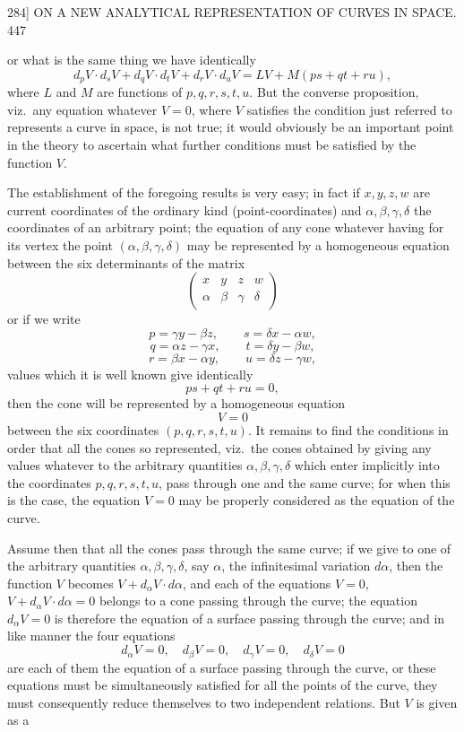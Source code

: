 \documentclass[11pt]{article}
\begin{document}
\begin{center}
\textsc{284]} \hfill ON A NEW ANALYTICAL REPRESENTATION OF CURVES IN SPACE. \hfill 447
\end{center}

or what is the same thing we have identically
\[ d_{p}V\cdot d_{s}V+d_{q}V\cdot d_{t}V+d_{r}V\cdot d_{u}V=LV+M(ps+qt+ru), \]
where $L$ and $M$ are functions of $p,q,r,s,t,u$. But the converse proposition, viz.\
any equation whatever $V=0$, where $V$ satisfies the condition just referred to
represents a curve in space, is not true; it would obviously be an important point
in the theory to ascertain what further conditions must be satisfied by the function
$V$.

The establishment of the foregoing results is very easy; in fact if $x,y,z,w$ are
current coordinates of the ordinary kind (point-coordinates) and $\alpha,\beta,\gamma,\delta$
the coordinates of an arbitrary point; the equation of any cone whatever having for
its vertex the point $(\alpha,\beta,\gamma,\delta)$ may be represented by a
homogeneous equation between the six determinants of the matrix
\[ \begin{pmatrix} x & y & z & w \\ \alpha & \beta & \gamma & \delta \end{pmatrix} \]
or if we write
\[ p=\gamma y-\beta z,\qquad s=\delta x-\alpha w, \]
\[ q=\alpha z-\gamma x,\qquad t=\delta y-\beta w, \]
\[ r=\beta x-\alpha y,\qquad u=\delta z-\gamma w, \]
values which it is well known give identically
\[ ps+qt+ru=0, \]
then the cone will be represented by a homogeneous equation
\[ V=0 \]
between the six coordinates $(p,q,r,s,t,u)$. It remains to find the conditions in
order that all the cones so represented, viz.\ the cones obtained by giving any
values whatever to the arbitrary quantities $\alpha,\beta,\gamma,\delta$ which enter
implicitly into the coordinates $p,q,r,s,t,u$, pass through one and the same curve;
for when this is the case, the equation $V=0$ may be properly considered as the
equation of the curve.

Assume then that all the cones pass through the same curve; if we give to one
of the arbitrary quantities $\alpha,\beta,\gamma,\delta$, say $\alpha$, the
infinitesimal variation $d\alpha$, then the function $V$ becomes $V+d_{\alpha}V\cdot d\alpha$,
and each of the equations $V=0$, $V+d_{\alpha}V\cdot d\alpha=0$ belongs to a cone
passing through the curve; the equation $d_{\alpha}V=0$ is therefore the equation of
a surface passing through the curve; and in like manner the four equations
\[ d_{\alpha}V=0,\quad d_{\beta}V=0,\quad d_{\gamma}V=0,\quad d_{\delta}V=0 \]
are each of them the equation of a surface passing through the curve, or these
equations must be simultaneously satisfied for all the points of the curve, they
must consequently reduce themselves to two independent relations. But $V$ is given as a
\end{document}
